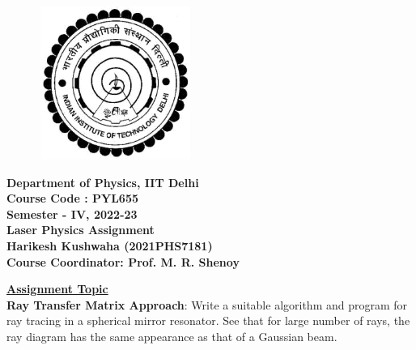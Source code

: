 \documentclass[12pt]{article}
\date{\today}
\begin{document}
\begin{titlepage}
    \begin{figure}
        \includegraphics[width=5cm, height=5cm]{logo.png}
        \centering
    \end{figure}
    \begin{center}
        \textbf{\Large{Department of Physics, IIT Delhi}}\\
        \vspace*{1cm}
        \textbf{\Large{Course Code : PYL655}}\\
        \vspace*{0.2cm}
        \textbf{\Large {Semester - IV, 2022-23}}\\
        \vspace*{1cm}
        \textbf{\LARGE{Laser Physics Assignment}}\\
        \vspace*{1cm}
        \textbf{\Large {Harikesh Kushwaha (2021PHS7181)}}\\
        \vspace*{1cm}
        \textbf{\Large {Course Coordinator: Prof. M. R. Shenoy}}\\
        \vspace*{1cm}
    \end{center}
    \begin{flushleft}
        \underline{\textbf{\LARGE{Assignment Topic}}}\\
        \Large{\textbf{Ray Transfer Matrix Approach}: Write a suitable algorithm and program for ray tracing in a spherical mirror resonator. See that for large number of rays, the ray diagram has the same appearance as that of a Gaussian beam.}
    \end{flushleft}
\end{titlepage}
\newpage
\end{document}

